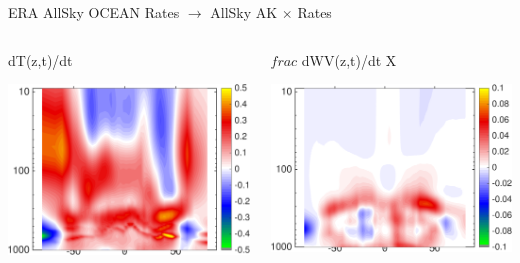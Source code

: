\documentclass[10pt,t]{beamer}
\begin{document}
\begin{frame}{ERA AllSky OCEAN Rates $\rightarrow$ AllSky AK $\times$ Rates}
\vspace{-0.35in}

\begin{columns}
\begin{column}{0.45\columnwidth}
\begin{block}{\footnotesize dT(z,t)/dt}
\vspace{-0.1in}
\begin{center}
\includegraphics[width=\linewidth]{Figs/CloudAnom/Desc_ocean/ak_x_ERAtzrates.png}
\end{center}
\end{block}
\end{column}

\begin{column}{0.45\columnwidth}
\begin{block}{\footnotesize $frac$ dWV(z,t)/dt}
\vspace{-0.1in}
X\begin{center}
\includegraphics[width=\linewidth]{Figs/CloudAnom/Desc_ocean/ak_x_ERAwvrates.png}
\end{center}
\end{block}
\end{column}
\end{columns}


\end{frame}
\end{document}

